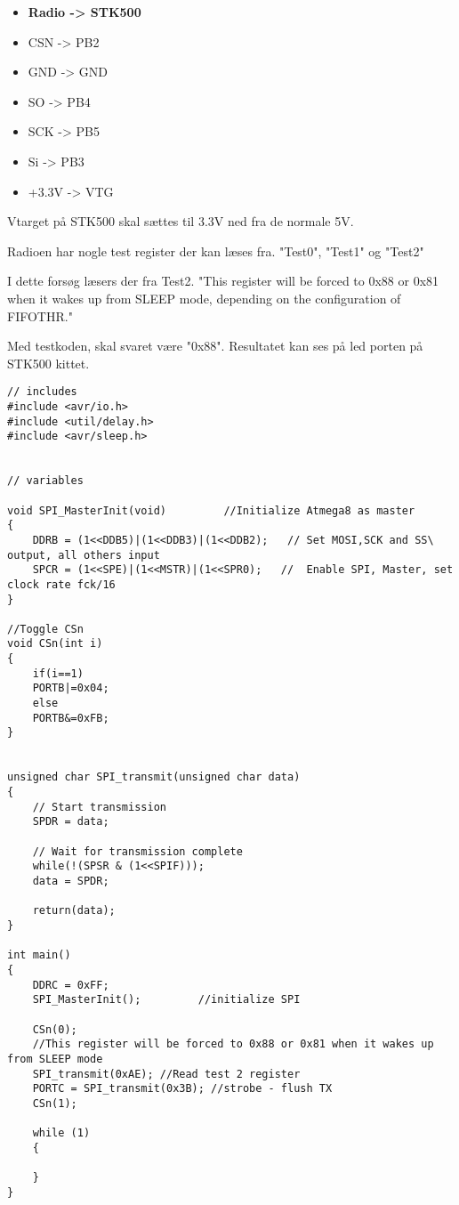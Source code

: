 \documentclass[Main]{subfiles}
\begin{document}
\begin{itemize}
\item \textbf{Radio -> 	STK500}
\item CSN	->	PB2
\item GND	->	GND
\item SO	->	PB4
\item SCK	->	PB5
\item Si	->	PB3
\item +3.3V	->	VTG
\end{itemize}


Vtarget på STK500 skal sættes til 3.3V ned fra de normale 5V.

Radioen har nogle test register der kan læses fra. "Test0", "Test1" og "Test2" 

I dette forsøg læsers der fra Test2.
"This register will be forced to 0x88 or 0x81 when it wakes up from
SLEEP mode, depending on the configuration of FIFOTHR." \cite{TI-cc1101}

Med testkoden, skal svaret være "0x88". Resultatet kan ses på led porten på STK500 kittet.

\begin{lstlisting}[caption=SPI test, style=Code-C, label=lst:itocLEs]
// includes
#include <avr/io.h>
#include <util/delay.h>
#include <avr/sleep.h>


// variables

void SPI_MasterInit(void)         //Initialize Atmega8 as master
{
	DDRB = (1<<DDB5)|(1<<DDB3)|(1<<DDB2);   // Set MOSI,SCK and SS\ output, all others input
	SPCR = (1<<SPE)|(1<<MSTR)|(1<<SPR0);   //  Enable SPI, Master, set clock rate fck/16
}

//Toggle CSn
void CSn(int i)
{
	if(i==1)
	PORTB|=0x04;
	else
	PORTB&=0xFB;
}


unsigned char SPI_transmit(unsigned char data)
{
	// Start transmission
	SPDR = data;

	// Wait for transmission complete
	while(!(SPSR & (1<<SPIF)));
	data = SPDR;

	return(data);
}

int main()
{
    DDRC = 0xFF;
	SPI_MasterInit();         //initialize SPI
	
	CSn(0);
	//This register will be forced to 0x88 or 0x81 when it wakes up from SLEEP mode
	SPI_transmit(0xAE); //Read test 2 register
	PORTC = SPI_transmit(0x3B); //strobe - flush TX
	CSn(1);

	while (1)
	{

	}
}
\end{lstlisting}
\end{document}
